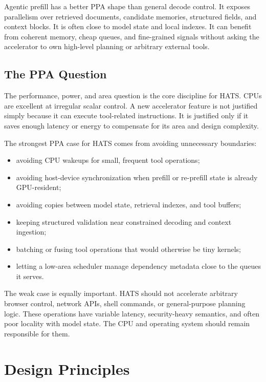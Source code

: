 \documentclass[11pt]{article}
\begin{document}
Agentic prefill has a better PPA shape than general decode control. It exposes
parallelism over retrieved documents, candidate memories, structured fields,
and context blocks. It is often close to model state and local indexes. It can
benefit from coherent memory, cheap queues, and fine-grained signals without
asking the accelerator to own high-level planning or arbitrary external tools.

\subsection{The PPA Question}

The performance, power, and area question is the core discipline for HATS. CPUs
are excellent at irregular scalar control. A new accelerator feature is not
justified simply because it can execute tool-related instructions. It is
justified only if it saves enough latency or energy to compensate for its area
and design complexity.

The strongest PPA case for HATS comes from avoiding unnecessary boundaries:

\begin{itemize}[leftmargin=*]
  \item avoiding CPU wakeups for small, frequent tool operations;
  \item avoiding host-device synchronization when prefill or re-prefill state is
        already GPU-resident;
  \item avoiding copies between model state, retrieval indexes, and tool
        buffers;
  \item keeping structured validation near constrained decoding and context
        ingestion;
  \item batching or fusing tool operations that would otherwise be tiny kernels;
  \item letting a low-area scheduler manage dependency metadata close to the
        queues it serves.
\end{itemize}

The weak case is equally important. HATS should not accelerate arbitrary
browser control, network APIs, shell commands, or general-purpose planning
logic. These operations have variable latency, security-heavy semantics, and
often poor locality with model state. The CPU and operating system should remain
responsible for them.

\section{Design Principles}
\end{document}
